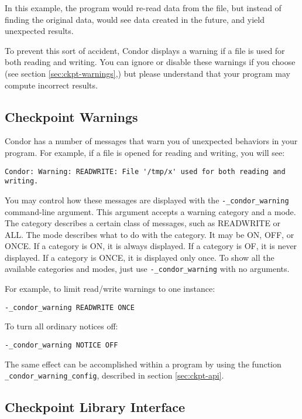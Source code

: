 In this example, the program would re-read data from the file, but
instead of finding the original data, would see data created in the
future, and yield unexpected results.

To prevent this sort of accident, Condor displays a warning
if a file is used for both reading and writing.  You can ignore or disable
these warnings if you choose (see section \ref{sec:ckpt-warnings},) but
please understand that your program may compute incorrect results.

\subsection{\label{sec:ckpt-warnings}Checkpoint Warnings}

Condor has a number of messages that warn you of unexpected
behaviors in your program.  For example, if a file is opened for reading
and writing, you will see:

\begin{verbatim}
Condor: Warning: READWRITE: File '/tmp/x' used for both reading and writing.
\end{verbatim}

You may control how these messages are displayed with the
\verb$-_condor_warning$ command-line argument.  This argument
accepts a warning category and a mode.  The category describes a certain
class of messages, such as READWRITE or ALL.  The mode describes what
to do with the category.  It may be ON, OFF, or ONCE.
If a category is ON, it is always displayed.
If a category is OF, it is never displayed.
If a category is ONCE, it is displayed only once.
To show all the available categories and modes, just use
\verb$-_condor_warning$ with no arguments.

For example, to limit read/write warnings to one instance:

\begin{verbatim}
-_condor_warning READWRITE ONCE
\end{verbatim}

To turn all ordinary notices off:

\begin{verbatim}
-_condor_warning NOTICE OFF
\end{verbatim}

The same effect can be accomplished within a program by using the function
\verb$_condor_warning_config$, described in section \ref{sec:ckpt-api}.

\subsection{\label{sec:ckpt-api}Checkpoint Library Interface}

